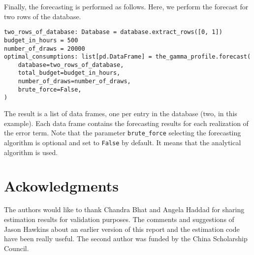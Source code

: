 \documentclass[12pt,a4paper]{article}
\begin{document}
Finally, the forecasting is performed as follows. Here, we perform the forecast for two rows of the database.
\begin{center}
         \begin{lstlisting}
two_rows_of_database: Database = database.extract_rows([0, 1])
budget_in_hours = 500
number_of_draws = 20000
optimal_consumptions: list[pd.DataFrame] = the_gamma_profile.forecast(
    database=two_rows_of_database,
    total_budget=budget_in_hours,
    number_of_draws=number_of_draws,
    brute_force=False,
)
          \end{lstlisting}
     \end{center}
The result is a list of data frames, one per entry in the database (two, in this example). Each data frame contains
the forecasting results for each realization of the error term. Note that the parameter \lstinline{brute_force} selecting the forecasting algorithm is
optional and set to \lstinline{False} by default. It means that the analytical algorithm is used.

\section{Ackowledgments}

The authors would like to thank Chandra Bhat and Angela Haddad for sharing estimation results for validation purposes.
The comments and suggestions of Jason Hawkins about an earlier version of this report and the estimation code have been really useful.
The second author was funded by the China Scholarship Council.



\end{document}
